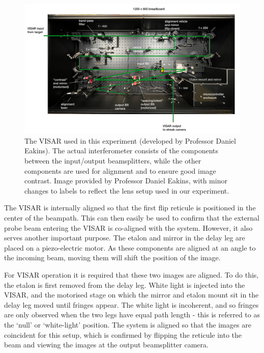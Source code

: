 \begin{figure}
\includegraphics[width=1.0\textwidth]{figures/Experiment/Dan_VISAR.PNG}%
\caption{\label{fig:Dan_VISAR} The VISAR used in this experiment (developed by Professor Daniel Eakins). The actual interferometer consists of the components between the input/output beamsplitters, while the other components are used for alignment and to ensure good image contrast. Image provided by Professor Daniel Eakins, with minor changes to labels to reflect the lens setup used in our experiment. }
\end{figure}

The VISAR is internally aligned so that the first flip reticule is positioned in the center of the beampath. This can then easily be used to confirm that the external probe beam entering the VISAR is co-aligned with the system. However, it also serves another important purpose. The etalon and mirror in the delay leg are placed on a piezo-electric motor. As these components are aligned at an angle to the incoming beam, moving them will shift the position of the image. 

For VISAR operation it is required that these two images are aligned. To do this, the etalon is first removed from the delay leg. White light is injected into the VISAR, and the motorised stage on which the mirror and etalon mount sit in the delay leg moved until fringes appear. The white light is incoherent, and so fringes are only observed when the two legs have equal path length - this is referred to as the `null' or `white-light' position. The system is aligned so that the images are coincident for this setup, which is confirmed by flipping the reticule into the beam and viewing the images at the output beamsplitter camera.


